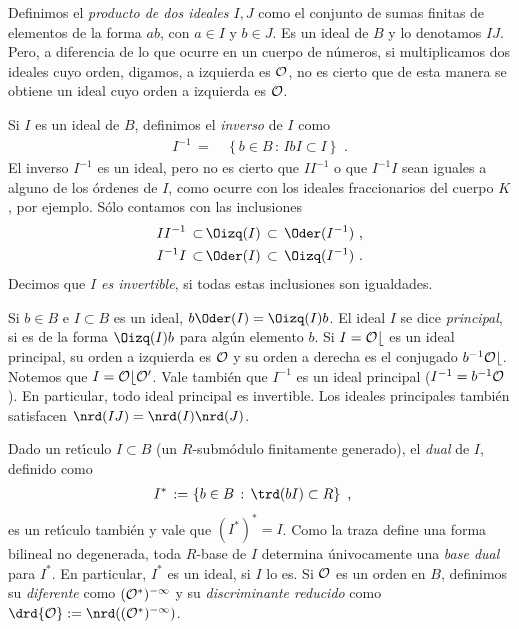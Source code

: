 Definimos el \emph{producto de dos ideales $I,J$} como el conjunto de
sumas finitas de elementos de la forma $ab$, con $a\in I$ y $b\in J$. Es
un ideal de $B$ y lo denotamos $IJ$. Pero, a diferencia de lo que ocurre en
un cuerpo de n\'{u}meros, si multiplicamos dos ideales cuyo orden, digamos,
a izquierda es $\cal{O}$, no es cierto que de esta manera se obtiene un
ideal cuyo orden a izquierda es $\cal{O}$.

Si $I$ es un ideal de $B$, definimos el \emph{inverso} de $I$ como
\begin{align*}
 I^{-1} \,=\, & \left\lbrace b\in B\,:\,
	IbI\subset I\right\rbrace
	\text{ .}
\end{align*}
%
El inverso $I^{-1}$ es un ideal, pero no es cierto que $II^{-1}$ o que
$I^{-1}I$ sean iguales a alguno de los \'{o}rdenes de $I$, como ocurre
con los ideales fraccionarios del cuerpo $K$, por ejemplo. S\'{o}lo
contamos con las inclusiones
\begin{align*}
 II^{-1}\,\subset\, & \Oizq(I)\,\subset\,\Oder(I^{-1})\text{ ,}\\
 I^{-1}I\,\subset\, & \Oder(I)\,\subset\,\Oizq(I^{-1})\text{ .}
\end{align*}
%
Decimos que \emph{$I$ es invertible}, si todas estas inclusiones son
igualdades.

Si $b\in B$ e $I\subset B$ es un ideal, $b\Oder(I)=\Oizq(I)b$. El ideal $I$
se dice \emph{principal}, si es de la forma $\Oizq(I)b$ para alg\'{u}n
elemento $b$. Si $I=\cal{O}b$ es un ideal principal, su orden a izquierda
es $\cal{O}$ y su orden a derecha es el conjugado $b^{-1}\cal{O}b$. Notemos
que $I=\cal{O}b\cal{O}'$. Vale tambi\'{e}n que $I^{-1}$ es un ideal principal
($I^{-1}=b^{-1}\cal{O}$). En particular, todo ideal principal es invertible.
Los ideales principales tambi\'{e}n satisfacen $\nrd(IJ)=\nrd(I)\nrd(J)$.

Dado un ret\'{\i}culo $I\subset B$ (un $R$-subm\'{o}dulo finitamente
generado), el \emph{dual} de $I$, definido como
\begin{align*}
	I^{*} \,:=\, & \left\lbrace b\in B\,:\,\trd(bI)\subset R\right\rbrace
	\text{ ,}
\end{align*}
%
es un ret\'{\i}culo tambi\'{e}n y vale que $(I^{*})^{*}=I$.
Como la traza define una forma bilineal no degenerada, toda $R$-base de
$I$ determina \'{u}nivocamente una \emph{base dual} para $I^{*}$. En
particular, $I^{*}$ es un ideal, si $I$ lo es. Si $\cal{O}$ es un orden en
$B$, definimos su \emph{diferente} como $(\cal{O}^{*})^{-1}$ y su
\emph{discriminante reducido} como $\drd{\cal{O}}:=\nrd((\cal{O}^{*})^{-1})$.

